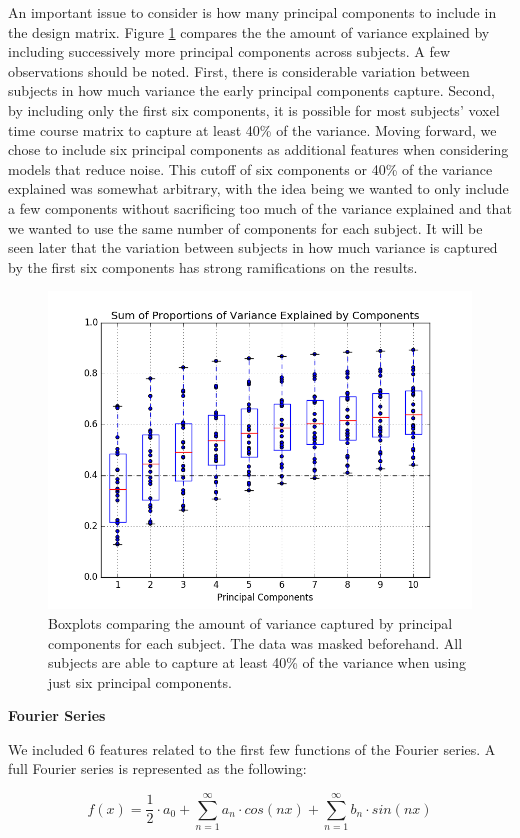 An important issue to consider is how many principal components to include in 
the design matrix. Figure \ref{fig:pcabox} compares the the amount of variance 
explained by including successively more principal components across subjects. 
A few observations should be noted. First, there is considerable variation 
between subjects in how much variance the early principal components capture. 
Second, by including only the first six components, it is possible for most 
subjects' voxel time course matrix to capture at least 40\% of the variance. 
Moving forward, we chose to include six principal components as additional 
features when considering models that reduce noise. This cutoff of six 
components or 40\% of the variance explained was somewhat arbitrary, with the 
idea being we wanted to only include a few components without sacrificing too 
much of the variance explained and that we wanted to use the same number of 
components for each subject. It will be seen later that the variation between 
subjects in how much variance is captured by the first six components has strong 
ramifications on the results. 

\begin{figure}[ht]
	\centering
	\includegraphics[width=.5\linewidth]{../images/pcaBOX.png}
 	\caption{Boxplots comparing the amount of variance captured by principal 
components for each subject. The data was masked beforehand. All subjects are 
able to capture at least 40\% of the variance when using just six principal 
components.}
 	\label{fig:pcabox}
\end{figure}


\vspace{2mm}
\noindent \textbf{Fourier Series}
\vspace{2mm}
\par We included 6 features related to the first few functions of the Fourier series.
A full Fourier series is represented as the following:

\begin{equation}
f(x) = \frac{1}{2} \cdot a_0 + \sum_{n=1}^{\infty} a_n \cdot cos(n x) + \sum_{n=1}^{\infty} b_n \cdot  sin(n x)
\end{equation}

